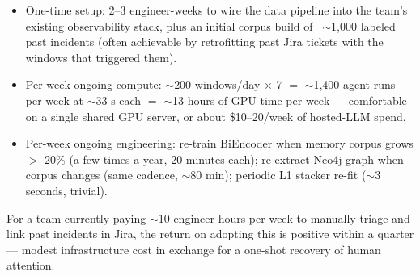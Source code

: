 \begin{itemize}
\item One-time setup: 2--3 engineer-weeks to wire the data pipeline into the team's existing observability stack, plus an initial corpus build of ~$\sim$1{,}000 labeled past incidents (often achievable by retrofitting past Jira tickets with the windows that triggered them).
\item Per-week ongoing compute: $\sim$200 windows/day $\times$ 7 $=$ $\sim$1{,}400 agent runs per week at $\sim$33 s each $=$ $\sim$13 hours of GPU time per week --- comfortable on a single shared GPU server, or about \$10--20/week of hosted-LLM spend.
\item Per-week ongoing engineering: re-train BiEncoder when memory corpus grows $>$ 20\% (a few times a year, 20 minutes each); re-extract Neo4j graph when corpus changes (same cadence, $\sim$80 min); periodic L1 stacker re-fit ($\sim$3 seconds, trivial).
\end{itemize}

For a team currently paying $\sim$10 engineer-hours per week to manually triage and link past incidents in Jira, the return on adopting this is positive within a quarter --- modest infrastructure cost in exchange for a one-shot recovery of human attention.
